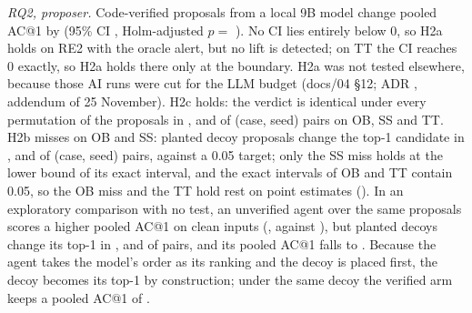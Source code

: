 \emph{RQ2, proposer.}
Code-verified proposals from a local 9B model change pooled AC@1 by  (95\% CI , Holm-adjusted $p = $ ).
No CI lies entirely below 0, so H2a holds on RE2 with the oracle alert, but no lift is detected; on TT the CI  reaches 0 exactly, so H2a holds there only at the boundary.
H2a was not tested elsewhere, because those AI runs were cut for the LLM budget (docs/04 §12; ADR \allowbreak{}, addendum of 25 November).
H2c holds: the verdict is identical under every permutation of the proposals in ,  and  of (case, seed) pairs on OB, SS and TT.
H2b misses on OB and SS: planted decoy proposals change the top-1 candidate in ,  and  of (case, seed) pairs, against a 0.05 target; only the SS miss holds at the lower bound of its exact interval, and the exact intervals of OB and TT contain 0.05, so the OB miss and the TT hold rest on point estimates ().
In an exploratory comparison with no test, an unverified agent over the same proposals scores a higher pooled AC@1 on clean inputs (, against ), but planted decoys change its top-1 in ,  and  of pairs, and its pooled AC@1 falls to .
Because the agent takes the model's order as its ranking and the decoy is placed first, the decoy becomes its top-1 by construction; under the same decoy the verified arm keeps a pooled AC@1 of .

